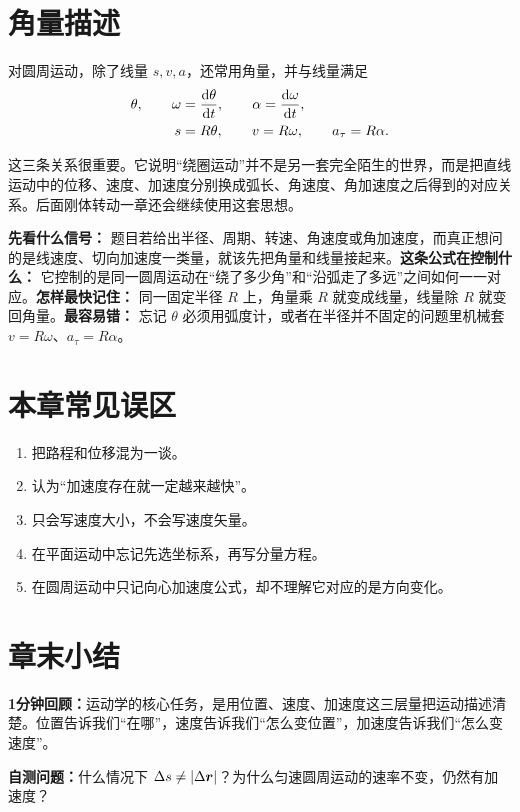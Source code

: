 \documentclass[lang=cn,11pt]{elegantbook}
\newcommand{\bridge}[1]{\begin{note}#1\end{note}}
\newcommand{\summaryline}[1]{\par\noindent\textbf{1分钟回顾：}#1\par}
\newcommand{\chapterselfcheck}[1]{\par\noindent\textbf{自测问题：}#1\par}
\begin{document}
\section{角量描述}

对圆周运动，除了线量 \(s,v,a\)，还常用角量，并与线量满足
\[
\begin{aligned}
\theta,\qquad \omega&=\dv{\theta}{t},\qquad \alpha=\dv{\omega}{t},\\
s&=R\theta,\qquad v=R\omega,\qquad a_\tau=R\alpha.
\end{aligned}
\]

\bridge{这三条关系很重要。它说明“绕圈运动”并不是另一套完全陌生的世界，而是把直线运动中的位移、速度、加速度分别换成弧长、角速度、角加速度之后得到的对应关系。后面刚体转动一章还会继续使用这套思想。}

\begin{note}
\textbf{先看什么信号：} 题目若给出半径、周期、转速、角速度或角加速度，而真正想问的是线速度、切向加速度一类量，就该先把角量和线量接起来。\textbf{这条公式在控制什么：} 它控制的是同一圆周运动在“绕了多少角”和“沿弧走了多远”之间如何一一对应。\textbf{怎样最快记住：} 同一固定半径 \(R\) 上，角量乘 \(R\) 就变成线量，线量除 \(R\) 就变回角量。\textbf{最容易错：} 忘记 \(\theta\) 必须用弧度计，或者在半径并不固定的问题里机械套 \(v=R\omega\)、\(a_\tau=R\alpha\)。
\end{note}

\section{本章常见误区}

\begin{remark}
\begin{enumerate}
  \item 把路程和位移混为一谈。
  \item 认为“加速度存在就一定越来越快”。
  \item 只会写速度大小，不会写速度矢量。
  \item 在平面运动中忘记先选坐标系，再写分量方程。
  \item 在圆周运动中只记向心加速度公式，却不理解它对应的是方向变化。
\end{enumerate}
\end{remark}

\section{章末小结}

\summaryline{运动学的核心任务，是用位置、速度、加速度这三层量把运动描述清楚。位置告诉我们“在哪”，速度告诉我们“怎么变位置”，加速度告诉我们“怎么变速度”。}
\chapterselfcheck{什么情况下 \(\Delta s\neq \abs{\Delta \vb*{r}}\)？为什么匀速圆周运动的速率不变，仍然有加速度？}
\end{document}
